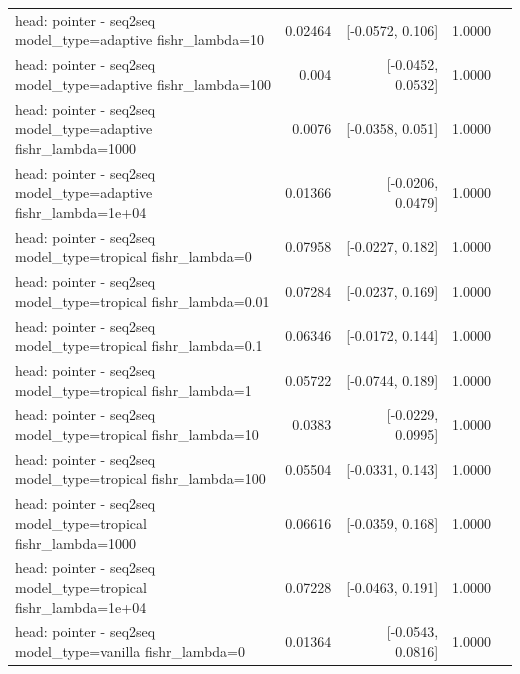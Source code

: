 \documentclass[10pt]{article}
\makeatletter
\newcommand{\stackcell}[1]{\begin{tabular}[t]{@{}l@{}}#1\end{tabular}}
\makeatother
\begin{document}
{\begin{longtable}{lrrrl}
\stackcell{head: pointer - seq2seq\\\footnotesize model\_type=adaptive fishr\_lambda=10 } & 0.02464 & [-0.0572, 0.106] & 1.0000 & \\
\stackcell{head: pointer - seq2seq\\\footnotesize model\_type=adaptive fishr\_lambda=100 } & 0.004 & [-0.0452, 0.0532] & 1.0000 & \\
\stackcell{head: pointer - seq2seq\\\footnotesize model\_type=adaptive fishr\_lambda=1000 } & 0.0076 & [-0.0358, 0.051] & 1.0000 & \\
\stackcell{head: pointer - seq2seq\\\footnotesize model\_type=adaptive fishr\_lambda=1e+04 } & 0.01366 & [-0.0206, 0.0479] & 1.0000 & \\
\stackcell{head: pointer - seq2seq\\\footnotesize model\_type=tropical fishr\_lambda=0 } & 0.07958 & [-0.0227, 0.182] & 1.0000 & \\
\stackcell{head: pointer - seq2seq\\\footnotesize model\_type=tropical fishr\_lambda=0.01 } & 0.07284 & [-0.0237, 0.169] & 1.0000 & \\
\stackcell{head: pointer - seq2seq\\\footnotesize model\_type=tropical fishr\_lambda=0.1 } & 0.06346 & [-0.0172, 0.144] & 1.0000 & \\
\stackcell{head: pointer - seq2seq\\\footnotesize model\_type=tropical fishr\_lambda=1 } & 0.05722 & [-0.0744, 0.189] & 1.0000 & \\
\stackcell{head: pointer - seq2seq\\\footnotesize model\_type=tropical fishr\_lambda=10 } & 0.0383 & [-0.0229, 0.0995] & 1.0000 & \\
\stackcell{head: pointer - seq2seq\\\footnotesize model\_type=tropical fishr\_lambda=100 } & 0.05504 & [-0.0331, 0.143] & 1.0000 & \\
\stackcell{head: pointer - seq2seq\\\footnotesize model\_type=tropical fishr\_lambda=1000 } & 0.06616 & [-0.0359, 0.168] & 1.0000 & \\
\stackcell{head: pointer - seq2seq\\\footnotesize model\_type=tropical fishr\_lambda=1e+04 } & 0.07228 & [-0.0463, 0.191] & 1.0000 & \\
\stackcell{head: pointer - seq2seq\\\footnotesize model\_type=vanilla fishr\_lambda=0 } & 0.01364 & [-0.0543, 0.0816] & 1.0000 & \\

\end{longtable}}
\end{document}
